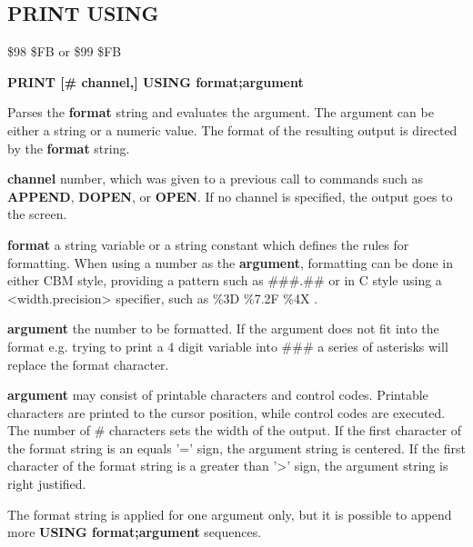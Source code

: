 \subsection{PRINT USING}
\begin{description}[leftmargin=2cm,style=nextline]
\item [Token:] \$98 \$FB or \$99 \$FB
\item [Format:] {\bf PRINT [\# channel,] USING format;argument}
\item [Usage:]  Parses the {\bf format} string and evaluates the argument.
                The argument can be either a string or a numeric value.
                The format of the resulting output is directed
                by the {\bf format} string.

                {\bf channel} number, which was given to a previous
                call to commands such as {\bf APPEND}, {\bf DOPEN}, or {\bf OPEN}.
                If no channel is specified, the output goes to the screen.

                {\bf format} a string variable or a string constant
                which defines the rules for formatting.
                When using a number as the {\bf argument}, formatting can be done in either
                CBM style, providing a pattern such as {\ttfamily \#\#\#.\#\#}
                or in C style using a <width.precision> specifier, such as {\ttfamily \%3D \%7.2F \%4X }.

                {\bf argument} the number to be formatted. If the argument does not fit into the format
                e.g. trying to print a 4 digit variable into {\ttfamily \#\#\#}
                a series of asterisks will replace the format character.

                {\bf argument} may consist of printable
                characters and control codes. Printable characters
                are printed to the cursor position, while control
                codes are executed.
                The number of {\ttfamily \#} characters sets the width of the output.
                If the first character of the format string
                is an equals '=' sign, the argument string is centered.
                If the first character of the format string
                is a greater than '>' sign, the argument string is right justified.

\item [Remarks:] The format string is applied for one argument only,
                 but it is possible to append more
                 {\bf USING format;argument} sequences.



\end{description}
